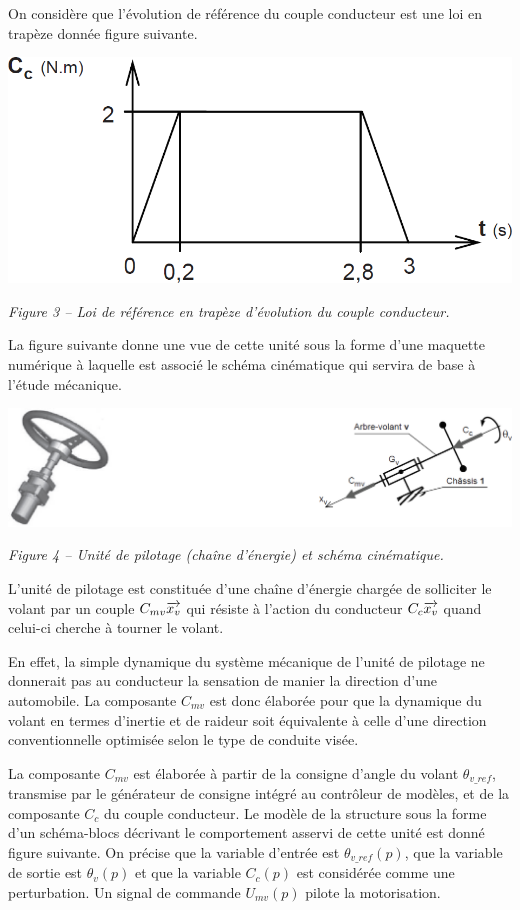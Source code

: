 \documentclass[10pt,fleqn]{article} %
\begin{document}
On considère que l'évolution de référence du couple conducteur est une loi en trapèze donnée
figure suivante.


\begin{center}
\includegraphics[width=.5\linewidth]{images/fig_13}

\textit{Figure 3 -- Loi de référence en trapèze d'évolution du couple conducteur.}
\end{center}

La figure suivante donne une vue de cette unité sous la forme d'une maquette numérique à laquelle est
associé le schéma cinématique qui servira de base à l'étude mécanique.

\begin{center}
\includegraphics[width=\linewidth]{images/fig_14}

\textit{Figure 4 -- Unité de pilotage (chaîne d'énergie) et schéma cinématique.}
\end{center}


L'unité de pilotage est constituée d'une chaîne d'énergie chargée de solliciter le volant par un
couple $C_{mv}\overrightarrow{x_v}$ qui résiste à l'action du conducteur $C_{c}\overrightarrow{x_v}$
quand celui-ci cherche à tourner le volant.

En effet, la simple dynamique du système mécanique de l'unité de pilotage ne donnerait pas au
conducteur la sensation de manier la direction d'une automobile. La composante $C_{mv}$ est donc élaborée
pour que la dynamique du volant en termes d'inertie et de raideur soit équivalente à celle d'une direction
conventionnelle optimisée selon le type de conduite visée.

La composante $C_{mv}$ est élaborée à partir de la consigne d'angle du volant $\theta_{v\_ref}$, transmise par le
générateur de consigne intégré au contrôleur de modèles, et de la composante $C_c$ du couple
conducteur.
Le modèle de la structure sous la forme d'un schéma-blocs décrivant le comportement asservi de cette
unité est donné figure suivante. On précise que la variable d'entrée est $\theta_{v\_ref}(p)$, que la variable de sortie est $\theta_{v}(p)$ et que la variable $C_c(p)$ est considérée comme une perturbation. Un signal de commande
$U_{mv}(p)$ pilote la motorisation.
\end{document}
